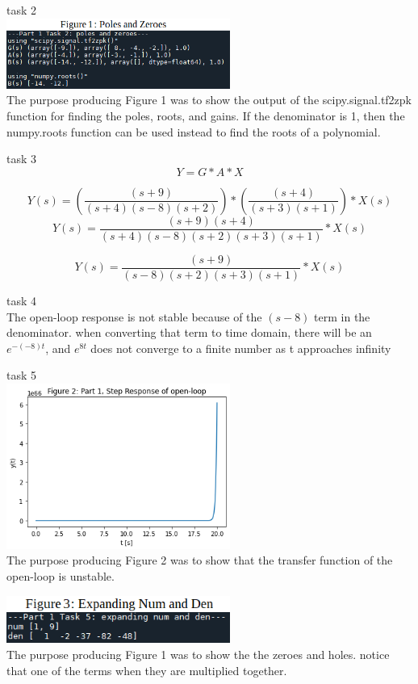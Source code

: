 \documentclass[12pt,a4paper]{article}
\begin{document}
task 2\\
\includegraphics[width=0.55\textwidth]{Figure1.png}\\
The purpose producing Figure 1 was to show the output of the scipy.signal.tf2zpk function for finding the poles, roots, and gains. If the denominator is 1, then the numpy.roots function can be used instead to find the roots of a polynomial.


task 3\\
\[Y = G*A*X\]

\[Y(s) = \left (\frac {(s+9)}{(s+4)(s-8)(s+2)}\right)*\left( \frac{(s+4)}{(s+3)(s+1)}\right)*X(s)\]
\[Y(s) = \frac {(s+9)(s+4)}{(s+4)(s-8)(s+2)(s+3)(s+1)}*X(s)\]

\[Y(s) = \frac{(s+9)}{(s-8)(s+2)(s+3)(s+1)}*X(s)\]

task 4\\
The open-loop response is not stable because of the $(s-8)$ term in the denominator. when converting that term to time domain, there will be an $e^{-(-8)t}$, and $e^{8t}$ does not converge to a finite number as t approaches infinity

task 5\\
\includegraphics[width=0.55\textwidth]{Figure2.png}\\
The purpose producing Figure 2 was to show that the transfer function of the open-loop is unstable. 

\includegraphics[width=0.55\textwidth]{Figure3.png}\\
The purpose producing Figure 1 was to show the the zeroes and holes. notice that one of the terms when they are multiplied together.
\end{document}
